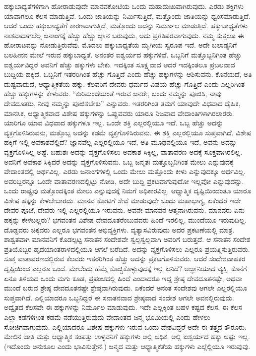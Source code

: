 ಹಕ್ಕುಬಾಧ್ಯತೆಗಳಿಗಾಗಿ ಹೋರಾಡುವುದೇ ಮಾನವಕೋಟಿಯ ಒಂದು ಮಹಾದುಃಖವಾಗಿರುವುದು. ಎರಡು ಶಕ್ತಿಗಳು ಯಾವಾಗಲೂ ಕೆಲಸ ಮಾಡುತ್ತಿವೆ. ಒಂದು ಜಾತಿಯನ್ನು ನಿರ್ಮಿಸುತ್ತಿದೆ, ಮತ್ತೊಂದು ಜಾತಿಯನ್ನು ಧ್ವಂಸಮಾಡುತ್ತಿದೆ. ಆದರೆ ಒಂದು ಹಕ್ಕುಬಾಧ್ಯತೆಗೆ ಕಾರಣವಾಗುತ್ತಿದೆ, ಮತ್ತೊಂದು ಅದನ್ನು ನಿರ್ಮೂಲ ಮಾಡುತ್ತಿದೆ. ಹಕ್ಕುಬಾಧ್ಯತೆಗಳು ನಾಶವಾದಾಗಲೆಲ್ಲ ಜನಾಂಗಕ್ಕೆ ಹೆಚ್ಚು ಹೆಚ್ಚು ಜ್ಞಾನ ಬರುವುದು, ಅದು ಪ್ರಗತಿಪರವಾಗುವುದು. ನಮ್ಮ ಸುತ್ತಲೂ ಈ ಹೋರಾಟವನ್ನು ನೋಡುತ್ತಿರುವೆವು. ಮೊದಲು ಹಕ್ಕುಬಾಧ್ಯತೆಯ ಮೃಗೀಯ ಸ್ವರೂಪ ಇದೆ. ಅದೇ ಬಲಾಡ್ಯನಿಗೆ ಬಲಹೀನನ ಮೇಲೆ ಇರುವ ಹಕ್ಕುಬಾಧ್ಯತೆ. ಅನಂತರ ಐಶ್ವರ್ಯದ ಹಕ್ಕುಗಳಿವೆ. ಒಬ್ಬನಿಗೆ ಮತ್ತೊಬ್ಬನಿಗಿಂತ ಹೆಚ್ಚು ಐಶ್ವರ್ಯವಿದ್ದರೆ ಅವನಿಗೆ ಹೆಚ್ಚು ಹಕ್ಕುಗಳು ಬೇಕು. ಇದಕ್ಕಿಂತ ಸೂಕ್ಷ್ಮವಾದ ಆದರೆ ಇದಕ್ಕಿಂತಲೂ ಪ್ರಬಲವಾದ ಬುದ್ದಿಯ ಹಕ್ಕಿದೆ. ಒಬ್ಬನಿಗೆ ಇತರರಿಗಿಂತ ಹೆಚ್ಚು ಗೊತ್ತಿದೆ ಎಂದು ಹೆಚ್ಚು ಹಕ್ಕುಗಳನ್ನು ಆಶಿಸುವನು. ಕೊನೆಯದೆ, ಅತಿ ದುಷ್ಟವಾದುದೆ, ಆಧ್ಯಾತ್ಮಿಕತೆಯ ಹಕ್ಕು. ಕೆಲವರಿಗೆ ದೇವರು ಧರ್ಮದ ವಿಷಯ ಹೆಚ್ಚು ಗೊತ್ತಿದೆ ಎಂದು ಎಲ್ಲರಿಗಿಂತ ಹೆಚ್ಚು ಹಕ್ಕುಗಳನ್ನು ಕೇಳುವರು. “ಕುರಿಮಂದೆಯಂತೆ ಇರುವ ಜನರೇ, ಬಂದು ನಮ್ಮನ್ನು ಪೂಜಿಸಿ, ನಾವು ದೇವದೂತರು, ನೀವು ನಮ್ಮನ್ನು ಪೂಜಿಸಬೇಕು” ಎನ್ನುವರು. ಇತರರಿಗಿಂತ ತಮಗೆ ಯಾವುದೇ ವಿಧವಾದ ದೈಹಿಕ, ಮಾನಸಿಕ, ಆಧ್ಯಾತ್ಮಿಕವಾದ ವಿಶೇಷ ಹಕ್ಕುಗಳನ್ನು ಒಪ್ಪುವವರು ಯಾರೂ ನಿಜವಾದ ವೇದಾಂತಿಗಳಾಗಿರಲಾರರು. ಯಾರಿಗೂ ಯಾವ ವಿಧವಾದ ಹಕ್ಕುಗಳೂ ಇಲ್ಲ. ಒಂದೇ ಶಕ್ತಿ ಎಲ್ಲರಲ್ಲಿಯೂ ಇದೆ. ಒಬ್ಬ ಹೆಚ್ಚು ಅದನ್ನು ವ್ಯಕ್ತಗೊಳಿಸಿರುವನು, ಮತ್ತೊಬ್ಬ ಅದನ್ನು ಕಡಮೆ ವ್ಯಕ್ತಗೊಳಿಸಿರುವನು. ಈ ಶಕ್ತಿ ಎಲ್ಲರಲ್ಲಿಯೂ ಸುಪ್ತವಾಗಿದೆ. ವಿಶೇಷ ಹಕ್ಕಿಗೆ ಇಲ್ಲಿ ಅವಕಾಶವೆಲ್ಲಿದೆ? ಜ್ಞಾನವೆಲ್ಲ ಎಲ್ಲರಲ್ಲಿಯೂ ಇದೆ, ಅತಿ ಮೂಢನಲ್ಲಿಯೂ ಇದೆ, ಅವನು ಅದನ್ನು ವ್ಯಕ್ತಗೊಳಿಸಿಲ್ಲ ಅಷ್ಟೆ. ಬಹುಶಃ ಅದನ್ನು ವ್ಯಕ್ತಗೊಳಿಸಲು ಅವಕಾಶ ಸಿಕ್ಕಿಲ್ಲ, ವಾತಾವರಣ ಅದಕ್ಕೆ ಸೂಕ್ತವಾಗಿರಲಿಲ್ಲ. ಅವನಿಗೆ ಅವಕಾಶ ಸಿಕ್ಕಿದರೆ ಅದನ್ನು ವ್ಯಕ್ತಗೊಳಿಸುವನು. ಒಬ್ಬ ಜನ್ಮತಃ ಮತ್ತೊಬ್ಬನಿಗಿಂತ ಮೇಲು ಎನ್ನುವುದಕ್ಕೆ ವೇದಾಂತದಲ್ಲಿ ಅರ್ಥವಿಲ್ಲ. ಎರಡು ಜನಾಂಗಗಳಲ್ಲಿ ಒಂದು ಮೇಲು ಮತ್ತೊಂದು ಕೀಳು ಎನ್ನುವುದಕ್ಕೂ ಅರ್ಥವಿಲ್ಲ. ಅವರಿಬ್ಬರನ್ನೂ ಒಂದೇ ವಾತಾವರಣದಲ್ಲಿಟ್ಟು ನೋಡಿ, ಅದೇ ಬುದ್ದಿ ಪ್ರಕಟವಾಗುವುದೋ ಇಲ್ಲವೋ ಎನ್ನುವುದನ್ನು. ಒಂದು ರಾಷ್ಟ್ರವು ಮತ್ತೊಂದಕ್ಕಿಂತ ಮೇಲು ಎನ್ನುವುದಕ್ಕೆ ನಿಮಗೆ ಅಧಿಕಾರವಿಲ್ಲ. ಆಧ್ಯಾತ್ಮಿಕ ದೃಷ್ಟಿಯಿಂದಂತೂ ಯಾರೂ ವಿಶೇಷ ಹಕ್ಕನ್ನು ಕೇಳಲೇಬಾರದು. ಮಾನವ ಕೋಟಿಗೆ ಸೇವೆ ಮಾಡುವುದೇ ಒಂದು ಮಹಾಭಾಗ್ಯ, ಏಕೆಂದರೆ ಇದೇ ದೇವರ ಪೂಜೆ, ದೇವರು ಇಲ್ಲಿ ಎಲ್ಲರಲ್ಲಿಯೂ ಇರುವನು. ಅವನೇ ಮಾನವನ ಆತ್ಮನಾಗಿರುವನು. ಮಾನವರು ಏನು ಹಕ್ಕನ್ನು ಕೇಳಬಲ್ಲರು? ಭಗವಂತನ ವಿಶೇಷ ದೇವದೂತರೆಂಬುವವರು ಹಿಂದೆ ಇರಲಿಲ್ಲ, ಮುಂದೆಯೂ ಇರುವುದಿಲ್ಲ. ದೊಡ್ಡವರು ಚಿಕ್ಕವರು ಎಲ್ಲರೂ ಭಗವಂತನ ಅಭಿವ್ಯಕ್ತಿಗಳು. ವ್ಯತ್ಯಾಸವಿರುವುದು ಅದರ ಪ್ರಕಟಣೆಯಲ್ಲಿ ಮಾತ್ರ. ಶಾಶ್ವತವಾಗಿ ಮಾನವನಿಗೆ ಕೊಡಲ್ಪಟ್ಟ ಸನಾತನ ಸಂದೇಶವೇ ಸ್ವಲ್ಪಸ್ವಲ್ಪವಾಗಿ ಅವರಿಗೆ ಬರುತ್ತದೆ. ಆ ಸನಾತನ ಸಂದೇಶ ಪ್ರತಿಯೊಬ್ಬರ ಹೃದಯಾಂತರಾಳದಲ್ಲಿಯೂ ಆಗಲೆ ಬರೆದಿದೆ. ಅದನ್ನು ವ್ಯಕ್ತಗೊಳಿಸಲು ಎಲ್ಲರೂ ಪ್ರಯತ್ನಿಸುತ್ತಿರುವರು. ಸೂಕ್ತ ವಾತಾವರಣದಲ್ಲಿರುವ ಕೆಲವರು ಇತರರಿಗಿಂತ ಹೆಚ್ಚು ಅದನ್ನು ಪ್ರಕಟಗೊಳಿಸುವರು. ಆದರೆ ಸಂದೇಶವಾಹಕರ ದೃಷ್ಟಿಯಿಂದ ಎಲ್ಲರೂ ಒಂದೆ. ಮೇಲೆಂದು ಹೆಮ್ಮೆ ಕೊಚ್ಚಿಕೊಳ್ಳುವುದಕ್ಕೆ ಇಲ್ಲಿ ಏನಿದೆ? ಅಜ್ಞಾನಿಯಾದ ವ್ಯಕ್ತಿ, ಕೊನೆಗೆ ಏನೂ ತಿಳಿಯದ ಒಂದು ಮಗು ಕೂಡ, ಪ್ರಪಂಚದಲ್ಲಿ ಹಿಂದೆ ಎಂದಾದರೂ ಇದ್ದ ಶ್ರೇಷ್ಠ ದೇವದೂತನಷ್ಟೇ, ಅಥವಾ ಮುಂದೆ ಬರುವ ಶ್ರೇಷ್ಠ ದೇವದೂತನಷ್ಟೇ ಶ್ರೇಷ್ಠವಾಗಿರುವುದು. ಏಕೆಂದರೆ ಅನಂತ ಸಂದೇಶವು ಆಗಲೇ ಎಲ್ಲರಲ್ಲಿಯೂ ಸುಪ್ತವಾಗಿದೆ. ಎಲ್ಲಿಯಾದರೂ ಒಬ್ಬನಿದ್ದರೆ ಈ ಸನಾತನವಾದ ಶ್ರೇಷ್ಠವಾದ ಸಂದೇಶ ಆಗಲೇ ಅವನಲ್ಲಿರುವುದು. ಅದ್ವೈತದ ಕೆಲಸವೇ ಈ ಹಕ್ಕುಗಳನ್ನು ನಿರ್ಮೂಲ ಮಾಡುವುದು. ಇದೇ ಎಲ್ಲಕ್ಕಿಂತ ಬಹಳ ಕಷ್ಟದ ಕೆಲಸ. ಈ ಕೆಲಸ ಎಲ್ಲಾ ಕಡೆಗಳಿಗಿಂತ ಕಡಮೆ ನಡೆಯುತ್ತಿರುವುದು ವೇದಾಂತದ ಜನ್ಮ ಭೂಮಿಯಲ್ಲಿ ಎಂದು ಹೇಳಲು ಸೋಜಿಗವಾಗುವುದು. ಎಲ್ಲಿಯಾದರೂ ವಿಶೇಷ ಹಕ್ಕುಗಳು ಇರುವ ಒಂದು ದೇಶವಿದ್ದರೆ ಅದೇ ಈ ತತ್ತ್ವದ ತೌರೂರು. ಮೇಲಿನ ಜಾತಿ ಮತ್ತು ಆಧ್ಯಾತ್ಮಿಕ ಸಂಪತ್ತು ಉಳ್ಳವನಿಗೆ ಹಕ್ಕುಗಳು ಅಲ್ಲಿ ಅಧಿಕ. ಅಲ್ಲಿ ಐಶ್ವರ್ಯದ ಹಕ್ಕು ಅಷ್ಟು ಇಲ್ಲ. (ಇದೊಂದು ಅನುಕೂಲ ಎಂದು ಭಾವಿಸುತ್ತೇನೆ.) ಜನ್ಮದ ಮತ್ತು ಆಧ್ಯಾತ್ಮಿಕತೆಯ ಹಕ್ಕುಗಳು ಎಲ್ಲೆಲ್ಲಿಯೂ ಇರುವುವು.

